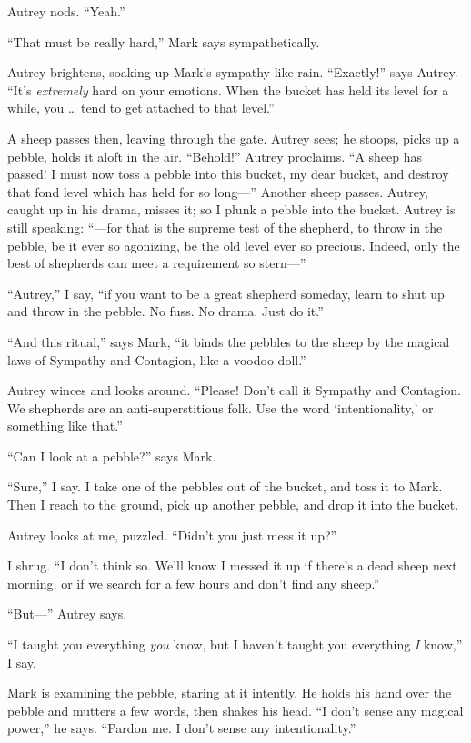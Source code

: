 {
 Autrey nods. ``Yeah.''}

{
 ``That must be really hard,''
Mark says sympathetically.}

{
 Autrey brightens, soaking up Mark's sympathy like
rain. ``Exactly!'' says Autrey.
``It's \textit{extremely} hard on your
emotions. When the bucket has held its level for a while, you \ldots
tend to get attached to that level.''}

{
 A sheep passes then, leaving through the gate. Autrey sees; he
stoops, picks up a pebble, holds it aloft in the air.
``Behold!'' Autrey proclaims.
``A sheep has passed! I must now toss a pebble into
this bucket, my dear bucket, and destroy that fond level which has held
for so long---'' Another sheep passes. Autrey, caught
up in his drama, misses it; so I plunk a pebble into the bucket. Autrey
is still speaking: ``---for that is the supreme test
of the shepherd, to throw in the pebble, be it ever so agonizing, be
the old level ever so precious. Indeed, only the best of shepherds can
meet a requirement so stern---''}

{
 ``Autrey,'' I say,
``if you want to be a great shepherd someday, learn to
shut up and throw in the pebble. No fuss. No drama. Just do
it.''}

{
 ``And this ritual,'' says Mark,
``it binds the pebbles to the sheep by the magical
laws of Sympathy and Contagion, like a voodoo
doll.''}

{
 Autrey winces and looks around. ``Please!
Don't call it Sympathy and Contagion. We shepherds are
an anti-superstitious folk. Use the word
`intentionality,' or something like
that.''}

{
 ``Can I look at a pebble?''
says Mark.}

{
 ``Sure,'' I say. I take one of
the pebbles out of the bucket, and toss it to Mark. Then I reach to the
ground, pick up another pebble, and drop it into the bucket.}

{
 Autrey looks at me, puzzled.
``Didn't you just mess it
up?''}

{
 I shrug. ``I don't think so.
We'll know I messed it up if there's a
dead sheep next morning, or if we search for a few hours and
don't find any sheep.''}

{
 ``But---'' Autrey says.}

{
 ``I taught you everything \textit{you} know, but
I haven't taught you everything \textit{I}
know,'' I say.}

{
 Mark is examining the pebble, staring at it intently. He holds his
hand over the pebble and mutters a few words, then shakes his head.
``I don't sense any magical
power,'' he says. ``Pardon me. I
don't sense any intentionality.''}

